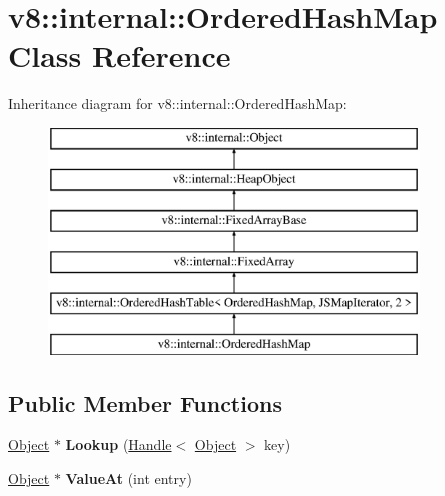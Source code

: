 \hypertarget{classv8_1_1internal_1_1_ordered_hash_map}{}\section{v8\+:\+:internal\+:\+:Ordered\+Hash\+Map Class Reference}
\label{classv8_1_1internal_1_1_ordered_hash_map}
Inheritance diagram for v8\+:\+:internal\+:\+:Ordered\+Hash\+Map\+:\begin{figure}[H]
\begin{center}
\leavevmode
\includegraphics[height=6.000000cm]{classv8_1_1internal_1_1_ordered_hash_map}
\end{center}
\end{figure}
\subsection*{Public Member Functions}
\begin{DoxyCompactItemize}
\item 
\hypertarget{classv8_1_1internal_1_1_ordered_hash_map_a015265288d3649710aded04cf3144067}{}\hyperlink{classv8_1_1internal_1_1_object}{Object} $\ast$ {\bfseries Lookup} (\hyperlink{classv8_1_1internal_1_1_handle}{Handle}$<$ \hyperlink{classv8_1_1internal_1_1_object}{Object} $>$ key)\label{classv8_1_1internal_1_1_ordered_hash_map_a015265288d3649710aded04cf3144067}

\item 
\hypertarget{classv8_1_1internal_1_1_ordered_hash_map_a2bb69496dc70645f1fd111e4c4538eb8}{}\hyperlink{classv8_1_1internal_1_1_object}{Object} $\ast$ {\bfseries Value\+At} (int entry)\label{classv8_1_1internal_1_1_ordered_hash_map_a2bb69496dc70645f1fd111e4c4538eb8}

\end{DoxyCompactItemize}
